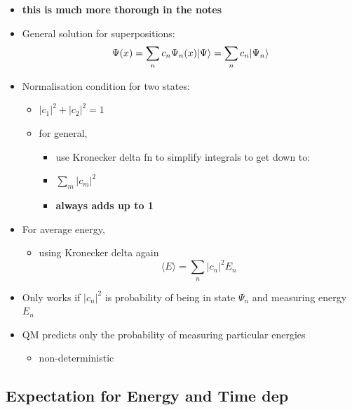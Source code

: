 \documentclass[a4paper,11pt,normalem]{article}
\begin{document}
\begin{itemize}
\item
  \textbf{this is much more thorough in the notes}
\item
  General solution for superpositions: \[
  \Psi(x) = \sum_{n} c_{n}\Psi_{n}(x) \\
  |\Psi\rangle  = \sum_{n} c_{n}|\Psi_{n}\rangle
  \]
\item
  Normalisation condition for two states:
  \begin{itemize}
  \item
    \(|c_{1}|^{2} + |c_{2}|^{2} = 1\)
  \item
    for general,
    \begin{itemize}
    \item
      use Kronecker delta fn to simplify integrals to get down to:
    \item
      \(\sum_{m}|c_{m}|^{2}\)
    \item
      \textbf{always adds up to 1}
    \end{itemize}
  \end{itemize}
\item
  For average energy,
  \begin{itemize}
  \item
    using Kronecker delta again \[
    \langle E \rangle = \sum_{n}|c_{n}|^{2}E_{n}
    \]
  \end{itemize}
\item
  Only works if \(|c_{n}|^{2}\) is probability of being in state
  \(\Psi_{n}\) and measuring energy \(E_{n}\)
\item
  QM predicts only the probability of measuring particular energies
  \begin{itemize}
  \item
    non-deterministic
  \end{itemize}
\end{itemize}

\subsection{Expectation for Energy and Time dep}\label{expectation-for-energy-and-time-dep}
\end{document}
